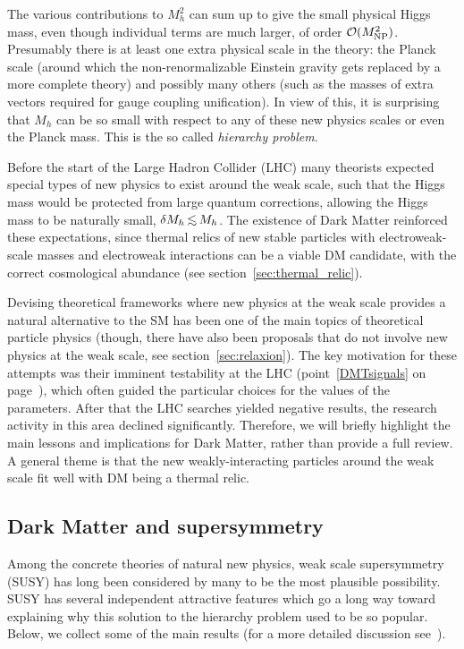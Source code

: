 The various contributions to $M_h^2$ can sum up to give the small physical Higgs mass, 
even though individual terms are much larger, of order ${\mathcal O}(M_{\rm NP}^2)$. 
Presumably there is at least one extra physical scale in the theory:
the Planck scale (around which the non-renormalizable Einstein gravity gets replaced by a more complete theory)
and possibly many others (such as the masses of extra vectors required for gauge coupling unification).
In view of this, it is surprising that $M_h$ can be so small with respect to any of these new physics scales or even the Planck mass. 
This is the so called {\em hierarchy problem}. 

\smallskip

Before the start of the Large Hadron Collider (LHC) many theorists expected special types of new physics to exist around the weak scale,
such that the Higgs mass would be protected from large quantum corrections, allowing the Higgs mass to be naturally small, $\delta M_h \circa{<} M_h$.
The existence of Dark Matter reinforced these expectations, since thermal relics of
new stable particles with electroweak-scale masses and electroweak interactions 
can be a viable DM candidate, with the correct cosmological abundance (see section~\ref{sec:thermal_relic}).

\medskip

Devising theoretical frameworks where new physics at the weak scale provides a natural alternative to the SM
has been one of the main topics of theoretical particle physics (though, there have also been proposals that do not involve new physics at the weak scale, see section~\ref{sec:relaxion}).
The key motivation for these attempts was their imminent 
testability at the LHC (point~\ref{DMTsignals} on page~\pageref{DMTsignals}), which often guided the particular choices for the values of the parameters. 
After that the LHC searches yielded negative results, the research activity in this area  declined significantly. 
Therefore, we will briefly highlight the main lessons and implications for Dark Matter, rather than provide a full review.
A general theme is that the new weakly-interacting particles around the weak scale fit well with DM being a thermal relic.


\subsection{Dark Matter and supersymmetry}
\label{SUSY}
\label{sec:SUSYDM}
Among the concrete theories of natural new physics, 
weak scale supersymmetry (SUSY) has long been considered by many to be the most plausible possibility.
SUSY has several independent attractive features which go a long way toward explaining why this solution to the hierarchy problem used to be so popular. 
Below, we collect some of the main results
(for a more detailed discussion see~\cite{otherpastDMreviews,SuSyDM,SUSY:intro}).

